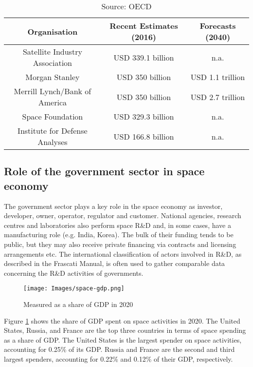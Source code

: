 \documentclass[12pt]{article}
\begin{document}
\begin{table}[ht]
    \centering
    \begin{tabular}{|c|c|c|}
        \hline
        \textbf{Organisation} & \textbf{Recent Estimates (2016)} & \textbf{Forecasts (2040)} \\
        \hline \hline
        Satellite Industry Association & USD 339.1 billion & n.a. \\
        \hline
        Morgan Stanley & USD 350 billion & USD 1.1 trillion \\
        \hline
        Merrill Lynch/Bank of America & USD 350 billion & USD 2.7 trillion  \\
        \hline
        Space Foundation & USD 329.3 billion & n.a. \\
        \hline
        Institute for Defense Analyses & USD 166.8 billion & n.a. \\
        \hline
    \end{tabular}
    \caption{Source: OECD}
    \label{tab:estimates}
\end{table}

\subsection{Role of the government sector in space economy}

The government sector plays a key role in the space economy as investor, developer, owner, operator, regulator and customer. National agencies, research centres and laboratories also perform space R\&D and, in some cases, have a manufacturing role (e.g. India, Korea). The bulk of their funding tends to be public, but they may also receive private financing via contracts and licensing arrangements etc. The international classification of actors involved in R\&D, as described in the Frascati Manual, is often used to gather comparable data concerning the R\&D activities of governments.

\begin{figure}[ht]
    \centering
    \texttt{[image: Images/space-gdp.png]}
    \caption{Measured as a share of GDP in 2020}
    \label{fig:space-gdp}
\end{figure}

Figure \ref{fig:space-gdp} shows the share of GDP spent on space activities in 2020. The United States, Russia, and France are the top three countries in terms of space spending as a share of GDP. The United States is the largest spender on space activities, accounting for 0.25\% of its GDP. Russia and France are the second and third largest spenders, accounting for 0.22\% and 0.12\% of their GDP, respectively.
\end{document}
